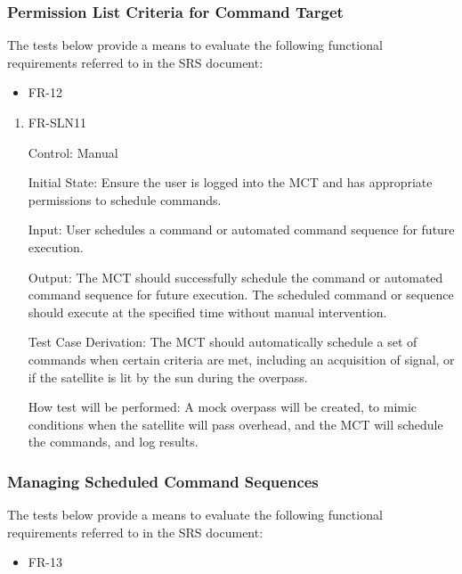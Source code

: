 \documentclass[12pt, titlepage]{article}
\begin{document}
\subsubsection{Permission List Criteria for Command Target}

The tests below provide a means to evaluate the following functional requirements referred to in the SRS document:
\begin{itemize}
    \item FR-12
\end{itemize}

\begin{enumerate}

\item{FR-SLN11\\}

Control: Manual
					
Initial State: Ensure the user is logged into the MCT and has appropriate permissions to schedule commands.
	
Input: User schedules a command or automated command sequence for future execution.
					
Output: The MCT should successfully schedule the command or automated command sequence for future execution. The scheduled command or sequence should execute at the specified time without manual intervention.

Test Case Derivation: The MCT should automatically schedule a set of commands when certain criteria are met, including an acquisition of signal, or if the satellite is lit by the sun during the overpass.
					
How test will be performed: A mock overpass will be created, to mimic conditions when the satellite will pass overhead, and the MCT will schedule the commands, and log results. 

\end{enumerate}

\subsubsection{Managing Scheduled Command Sequences}

The tests below provide a means to evaluate the following functional requirements referred to in the SRS document:
\begin{itemize}
    \item FR-13
\end{itemize}
\end{document}
